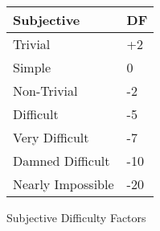 

\begin{SHTable}[h]
	\begin{tabular}{l|l}
	Subjective						& DF \\
	\hline
    Trivial			& +2 \\
	Simple			&  0 \\
	Non-Trivial	 	&  -2 \\
	Difficult		&  -5 \\
	Very Difficult  & -7 \\ 
	Damned Difficult & -10 \\
   	Nearly Impossible & -20 \\
	\end{tabular}
    \caption{Subjective Difficulty Factors}\label{Table:SubjectiveDFs}
\end{SHTable}

